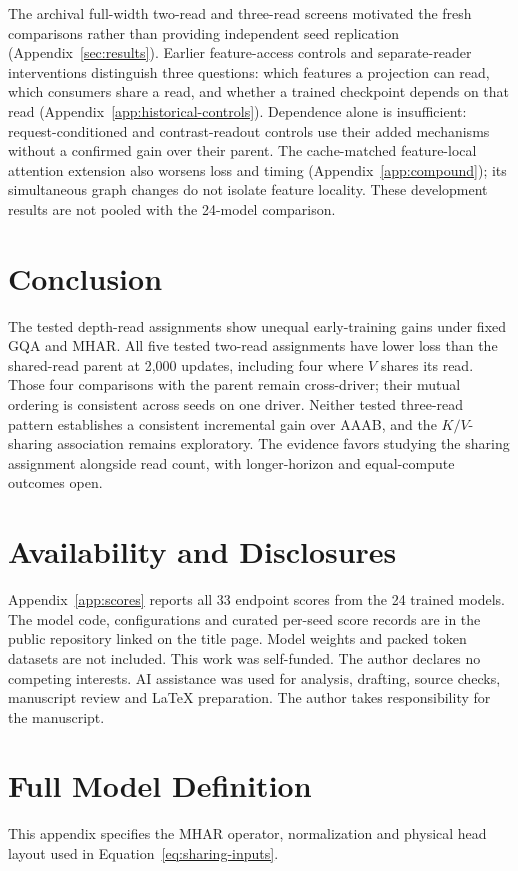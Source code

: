 \documentclass[11pt,letterpaper]{article}
\newcommand{\route}[1]{\textsf{#1}}
\begin{document}
The archival full-width two-read and three-read screens motivated the fresh
comparisons rather than providing independent seed replication
(Appendix~\ref{sec:results}). Earlier feature-access controls and
separate-reader interventions distinguish three questions: which features
a projection can read, which consumers share a read, and whether a trained
checkpoint depends on that read (Appendix~\ref{app:historical-controls}).
Dependence alone is insufficient: request-conditioned and contrast-readout
controls use their added mechanisms without a confirmed gain over their parent. The
cache-matched feature-local attention extension also worsens loss and timing
(Appendix~\ref{app:compound}); its simultaneous graph changes do not isolate
feature locality. These development results are not pooled with the 24-model
comparison.

\section{Conclusion}
\label{sec:conclusion}
The tested depth-read assignments show unequal early-training gains under fixed
GQA and MHAR. All five tested two-read assignments have lower loss than the
shared-read parent at 2,000 updates, including four where $V$ shares its read.
Those four comparisons with the parent remain cross-driver; their mutual
ordering is consistent across seeds on one driver. Neither tested three-read
pattern establishes a consistent incremental gain over \route{AAAB}, and the
$K/V$-sharing association remains exploratory. The evidence favors studying the
sharing assignment alongside read count, with longer-horizon and equal-compute
outcomes open.

\section*{Availability and Disclosures}
Appendix~\ref{app:scores} reports all 33 endpoint scores from the 24 trained models.
The model code, configurations and curated per-seed score records are in the
public repository linked on the title page. Model weights and packed token
datasets are not included. This work was self-funded. The author declares no competing
interests.
AI assistance was used for analysis, drafting, source checks, manuscript
review and LaTeX preparation. The author takes responsibility for the manuscript.

\clearpage
\appendix
\section{Full Model Definition}
\label{app:model}
This appendix specifies the MHAR operator, normalization and physical head
layout used in Equation~\ref{eq:sharing-inputs}.
\end{document}
